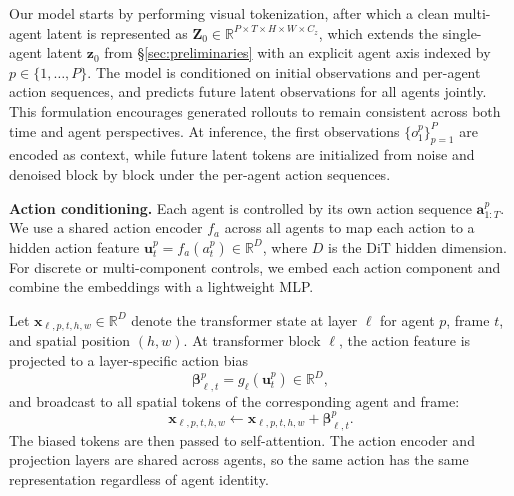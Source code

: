 \documentclass{llmxive}
\begin{document}
Our model starts by performing visual tokenization, after which a clean multi-agent latent is represented as
$\mathbf{Z}_0\in\mathbb{R}^{P\times T\times H\times W\times C_z}$,
which extends the single-agent latent $\mathbf{z}_0$ from \S\ref{sec:preliminaries} with an explicit agent axis indexed by $p\in\{1,\ldots,P\}$.
The model is conditioned on initial observations and per-agent action sequences, and predicts future latent observations for all agents jointly.
This formulation encourages generated rollouts to remain consistent across both time and agent perspectives.
At inference, the first observations $\{o_1^p\}_{p=1}^P$ are encoded as context, while future latent tokens are initialized from noise and denoised block by block under the per-agent action sequences.


\noindent\textbf{Action conditioning.}
\label{sec:action-conditioning}
Each agent is controlled by its own action sequence $\mathbf{a}^p_{1:T}$.
We use a shared action encoder $f_a$ across all agents to map each action to a hidden action feature
$\mathbf{u}_t^p = f_a(a_t^p) \in \mathbb{R}^{D}$,
where $D$ is the DiT hidden dimension.
For discrete or multi-component controls, we embed each action component and combine the embeddings with a lightweight MLP.

Let $\mathbf{x}_{\ell,p,t,h,w}\in\mathbb{R}^{D}$ denote the transformer state at layer $\ell$ for agent $p$, frame $t$, and spatial position $(h,w)$.
At transformer block $\ell$, the action feature is projected to a layer-specific action bias
\begin{equation}
\boldsymbol{\beta}_{\ell,t}^p = g_\ell(\mathbf{u}_t^p) \in \mathbb{R}^{D},
\end{equation}
and broadcast to all spatial tokens of the corresponding agent and frame:
\begin{equation}
\mathbf{x}_{\ell,p,t,h,w}
\leftarrow
\mathbf{x}_{\ell,p,t,h,w}
+
\boldsymbol{\beta}_{\ell,t}^p .
\end{equation}
The biased tokens are then passed to self-attention.
The action encoder and projection layers are shared across agents, so the same action has the same representation regardless of agent identity. 
\end{document}
